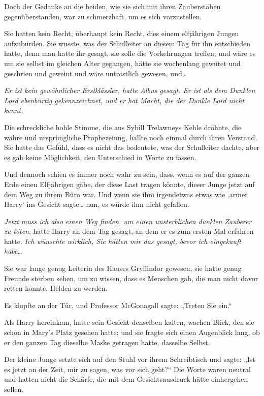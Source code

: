 {Doch der Gedanke an die beiden, wie sie sich mit ihren Zauberstäben gegenüberstanden, war zu schmerzhaft, um es sich vorzustellen.

Sie hatten kein Recht, überhaupt kein Recht, dies einem elfjährigen Jungen aufzubürden. Sie wusste, was der Schulleiter an diesem Tag für ihn entschieden hatte, denn man hatte ihr gesagt, sie solle die Vorkehrungen treffen; und wäre es um sie selbst im gleichen Alter gegangen, hätte sie wochenlang gewütet und geschrien und geweint und wäre untröstlich gewesen, und…

\emph{\emph{Er ist kein gewöhnlicher Erstklässler,} hatte Albus gesagt. \emph{Er ist als dem Dunklen Lord ebenbürtig gekennzeichnet, und er hat Macht, die der Dunkle Lord nicht kennt.}}

Die schreckliche hohle Stimme, die aus Sybill Trelawneys Kehle dröhnte, die wahre und ursprüngliche Prophezeiung, hallte noch einmal durch ihren Verstand. Sie hatte das Gefühl, dass es nicht das bedeutete, was der Schulleiter dachte, aber es gab keine Möglichkeit, den Unterschied in Worte zu fassen.

Und dennoch schien es immer noch wahr zu sein, dass, wenn es auf der ganzen Erde einen Elfjährigen gäbe, der diese Last tragen könnte, dieser Junge jetzt auf dem Weg zu ihrem Büro war. Und wenn sie ihm irgendetwas etwas wie ‚armer Harry` ins Gesicht sagte… nun, es würde ihm nicht gefallen.

\emph{Jetzt muss ich also einen Weg finden, um einen unsterblichen dunklen Zauberer zu töten}, hatte Harry an dem Tag gesagt, an dem er es zum ersten Mal erfahren hatte. \emph{Ich wünschte wirklich, Sie hätten mir das gesagt, bevor ich eingekauft habe}…

Sie war lange genug Leiterin des Hauses Gryffindor gewesen, sie hatte genug Freunde sterben sehen, um zu wissen, dass es Menschen gab, die man nicht davor retten konnte, Helden zu werden.

Es klopfte an der Tür, und Professor McGonagall sagte: „Treten Sie ein.“

Als Harry hereinkam, hatte sein Gesicht denselben kalten, wachen Blick, den sie schon in Mary's Platz gesehen hatte; und sie fragte sich einen Augenblick lang, ob er den ganzen Tag dieselbe Maske getragen hatte, dasselbe Selbst.

Der kleine Junge setzte sich auf den Stuhl vor ihrem Schreibtisch und sagte: „Ist es jetzt an der Zeit, mir zu sagen, was vor sich geht?“ Die Worte waren neutral und hatten nicht die Schärfe, die mit dem Gesichtsausdruck hätte einhergehen sollen.

}
